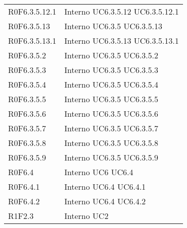 \begin{longtable}{p{2.5cm}!{\VRule[1pt]}p{2.5cm}}
R0F6.3.5.12.1 & Interno \newline UC6.3.5.12
 \newline UC6.3.5.12.1
 \\
R0F6.3.5.13 & Interno \newline UC6.3.5
 \newline UC6.3.5.13
 \\
R0F6.3.5.13.1 & Interno \newline UC6.3.5.13
 \newline UC6.3.5.13.1
 \\
R0F6.3.5.2 & Interno \newline UC6.3.5
 \newline UC6.3.5.2
 \\
R0F6.3.5.3 & Interno \newline UC6.3.5
 \newline UC6.3.5.3
 \\
R0F6.3.5.4 & Interno \newline UC6.3.5
 \newline UC6.3.5.4
 \\
R0F6.3.5.5 & Interno \newline UC6.3.5
 \newline UC6.3.5.5
 \\
R0F6.3.5.6 & Interno \newline UC6.3.5
 \newline UC6.3.5.6
 \\
R0F6.3.5.7 & Interno \newline UC6.3.5
 \newline UC6.3.5.7
 \\
R0F6.3.5.8 & Interno \newline UC6.3.5
 \newline UC6.3.5.8
 \\
R0F6.3.5.9 & Interno \newline UC6.3.5
 \newline UC6.3.5.9
 \\
R0F6.4 & Interno \newline UC6
 \newline UC6.4
 \\
R0F6.4.1 & Interno \newline UC6.4
 \newline UC6.4.1
 \\
R0F6.4.2 & Interno \newline UC6.4
 \newline UC6.4.2
 \\
R1F2.3 & Interno \newline UC2

\end{longtable}
